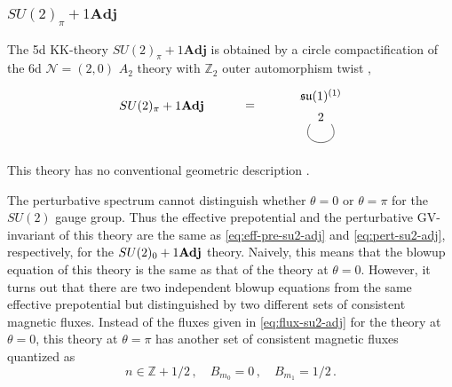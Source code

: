\subsubsection{\texorpdfstring{$SU(2)_\pi+1\mathbf{Adj}$}{SU(2)pi + 1Adj}}\label{sec:su2pi+1adj}

The 5d KK-theory $ SU(2)_\pi + 1\mathbf{Adj} $ is obtained by a circle compactification of the 6d $\mathcal{N}=(2,0)$ $A_2$ theory with $ \mathbb{Z}_2 $ outer automorphism twist \cite{Tachikawa:2011ch},
\begin{align}
\begin{tikzpicture}
\draw (0, 0) node {$ SU(2)_\pi + 1\mathbf{Adj} $}
(2.5, 0) node {$ = $}
(4.5, 0.3) node {$ \mathfrak{su}(1)^{(1)} $}
(4.5, -0.3) node {$ 2 $};
\draw (4.2, -0.5) .. controls (3.8, -1.2) and (5.2, -1.2) .. (4.8, -0.5);
\end{tikzpicture}
\end{align}
This theory has no conventional geometric description \cite{Bhardwaj:2019fzv}.

The perturbative spectrum cannot distinguish whether $\theta=0$ or $\theta=\pi$ for the $SU(2)$ gauge group. Thus the effective prepotential and the perturbative GV-invariant of this theory are the same as \eqref{eq:eff-pre-su2-adj} and \eqref{eq:pert-su2-adj}, respectively, for the $SU(2)_0+1{\bf Adj}$ theory. Naively, this means that the blowup equation of this theory is the same as that of the theory at $\theta=0$. However, it turns out that there are two independent blowup equations from the same effective prepotential but distinguished by two different sets of consistent magnetic fluxes. Instead of the fluxes given in \eqref{eq:flux-su2-adj} for the theory at $\theta=0$, this theory at $\theta=\pi$ has another set of consistent magnetic fluxes quantized as
\begin{equation}
	n \in \mathbb{Z} + 1/2 \, , \quad B_{m_0}=0 \, , \quad B_{m_1}=1/2 \, .
\end{equation}

